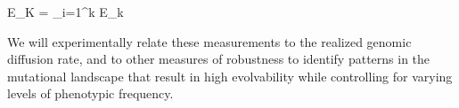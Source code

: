 E_{K} =  { \sum_{i=1}^{k}} E_k 


We will experimentally relate these measurements to the realized genomic diffusion rate, and to other measures of robustness to identify patterns in the mutational landscape that result in high evolvability while controlling for varying levels of phenotypic frequency.
